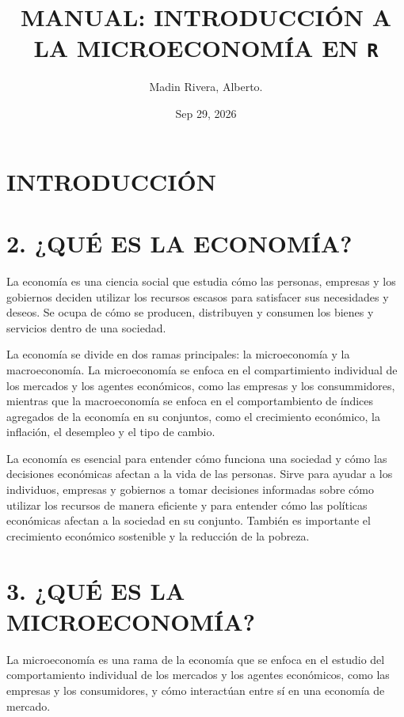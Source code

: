 \documentclass[
  spanish,
  12pt,
]{book}
\title{\textbf{MANUAL: INTRODUCCIÓN A LA MICROECONOMÍA EN \texttt{R}}}
\author{Madin Rivera, Alberto.}
\date{Sep 29, 2026}
\begin{document}
\frontmatter
\maketitle

{
\setcounter{tocdepth}{1}
\tableofcontents
}
\mainmatter
\chapter{INTRODUCCIÓN}\label{introducciuxf3n}

\chapter{2. ¿QUÉ ES LA ECONOMÍA?}\label{quuxe9-es-la-economuxeda}

La economía es una ciencia social que estudia cómo las personas,
empresas y los gobiernos deciden utilizar los recursos escasos para
satisfacer sus necesidades y deseos. Se ocupa de cómo se producen,
distribuyen y consumen los bienes y servicios dentro de una sociedad.

La economía se divide en dos ramas principales: la microeconomía y la
macroeconomía. La microeconomía se enfoca en el compartimiento
individual de los mercados y los agentes económicos, como las empresas y
los consummidores, mientras que la macroeconomía se enfoca en el
comportambiento de índices agregados de la economía en su conjuntos,
como el crecimiento económico, la inflación, el desempleo y el tipo de
cambio.

La economía es esencial para entender cómo funciona una sociedad y cómo
las decisiones económicas afectan a la vida de las personas. Sirve para
ayudar a los individuos, empresas y gobiernos a tomar decisiones
informadas sobre cómo utilizar los recursos de manera eficiente y para
entender cómo las políticas económicas afectan a la sociedad en su
conjunto. También es importante el crecimiento económico sostenible y la
reducción de la pobreza.

\chapter{3. ¿QUÉ ES LA
MICROECONOMÍA?}\label{quuxe9-es-la-microeconomuxeda}

La microeconomía es una rama de la economía que se enfoca en el estudio
del comportamiento individual de los mercados y los agentes económicos,
como las empresas y los consumidores, y cómo interactúan entre sí en una
economía de mercado.
\end{document}
